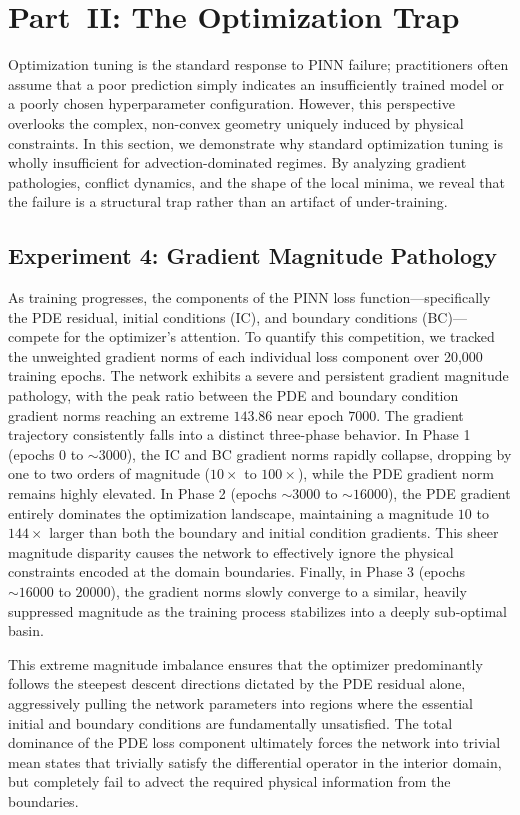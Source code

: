 \section{Part~II: The Optimization Trap}\label{sec:part2}

Optimization tuning is the standard response to PINN failure; practitioners often assume that a poor prediction simply indicates an insufficiently trained model or a poorly chosen hyperparameter configuration. However, this perspective overlooks the complex, non-convex geometry uniquely induced by physical constraints. In this section, we demonstrate why standard optimization tuning is wholly insufficient for advection-dominated regimes. By analyzing gradient pathologies, conflict dynamics, and the shape of the local minima, we reveal that the failure is a structural trap rather than an artifact of under-training.

\subsection{Experiment 4: Gradient Magnitude Pathology}\label{sec:exp4}

As training progresses, the components of the PINN loss function—specifically the PDE residual, initial conditions (IC), and boundary conditions (BC)—compete for the optimizer's attention. To quantify this competition, we tracked the unweighted gradient norms of each individual loss component over 20,000 training epochs. The network exhibits a severe and persistent gradient magnitude pathology, with the peak ratio between the PDE and boundary condition gradient norms reaching an extreme $143.86$ near epoch $7000$. The gradient trajectory consistently falls into a distinct three-phase behavior. In Phase 1 (epochs $0$ to $\sim3000$), the IC and BC gradient norms rapidly collapse, dropping by one to two orders of magnitude ($10\times$ to $100\times$), while the PDE gradient norm remains highly elevated. In Phase 2 (epochs $\sim3000$ to $\sim16000$), the PDE gradient entirely dominates the optimization landscape, maintaining a magnitude $10$ to $144\times$ larger than both the boundary and initial condition gradients. This sheer magnitude disparity causes the network to effectively ignore the physical constraints encoded at the domain boundaries. Finally, in Phase 3 (epochs $\sim16000$ to $20000$), the gradient norms slowly converge to a similar, heavily suppressed magnitude as the training process stabilizes into a deeply sub-optimal basin.

This extreme magnitude imbalance ensures that the optimizer predominantly follows the steepest descent directions dictated by the PDE residual alone, aggressively pulling the network parameters into regions where the essential initial and boundary conditions are fundamentally unsatisfied. The total dominance of the PDE loss component ultimately forces the network into trivial mean states that trivially satisfy the differential operator in the interior domain, but completely fail to advect the required physical information from the boundaries.

